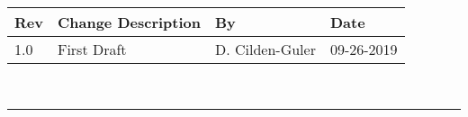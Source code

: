 \documentclass[]{BasiliskReportMemo}
\begin{document}
\makeCover

%
%
\pagestyle{empty}
{\renewcommand{\arraystretch}{2}
\noindent
\begin{longtable}{|p{0.5in}|p{3.5in}|p{1.07in}|p{0.9in}|}
\hline
{\bfseries Rev} & {\bfseries Change Description} & {\bfseries By}& {\bfseries Date} \\
\hline
1.0 & First Draft & D. Cilden-Guler & 09-26-2019\\
\hline

\end{longtable}
}



\newpage
\setcounter{page}{1}
\pagestyle{fancy}

\tableofcontents %
~\\ \hrule ~\\ %










\end{document}
